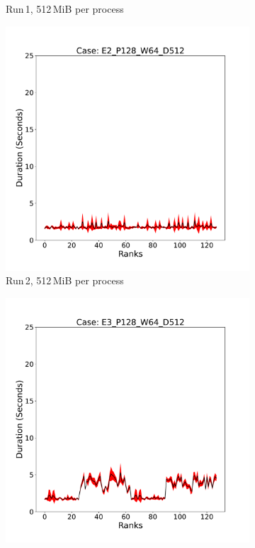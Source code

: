 \begin{figure}
\begin{subfigure}[b]{0.3\textwidth}
         \caption{Run\,1, 512\,MiB per process}
         \label{fig:E1_512_d11}
     \end{subfigure}
     \hfill
     \begin{subfigure}[b]{0.3\textwidth}
         \centering
         \includegraphics[width=\textwidth, height=\textwidth]{figures/deisa1__E2_P128_W64_D512.pdf}
         \caption{Run\,2, 512\,MiB per process}
         \label{fig:E2_512_d11}
     \end{subfigure}
      \hfill
     \begin{subfigure}[b]{0.3\textwidth}
         \centering
         \includegraphics[width=\textwidth, height=\textwidth]{figures/deisa1__E3_P128_W64_D512.pdf}

\end{subfigure}
\end{figure}
